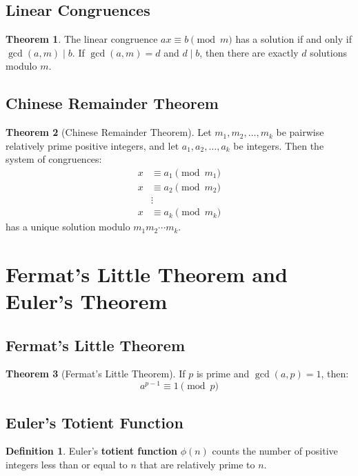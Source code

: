 \documentclass[11pt]{article}
\theoremstyle{definition}
\newtheorem{definition}{Definition}[section]
\newtheorem{theorem}{Theorem}[section]
\begin{document}
\subsection{Linear Congruences}
\begin{theorem}
The linear congruence $ax \equiv b \pmod{m}$ has a solution if and only if $\gcd(a,m) \mid b$. If $\gcd(a,m) = d$ and $d \mid b$, then there are exactly $d$ solutions modulo $m$.
\end{theorem}

\subsection{Chinese Remainder Theorem}
\begin{theorem}[Chinese Remainder Theorem]
Let $m_1, m_2, \ldots, m_k$ be pairwise relatively prime positive integers, and let $a_1, a_2, \ldots, a_k$ be integers. Then the system of congruences:
\begin{align}
x &\equiv a_1 \pmod{m_1} \\
x &\equiv a_2 \pmod{m_2} \\
&\vdots \\
x &\equiv a_k \pmod{m_k}
\end{align}
has a unique solution modulo $m_1 m_2 \cdots m_k$.
\end{theorem}

\section{Fermat's Little Theorem and Euler's Theorem}

\subsection{Fermat's Little Theorem}
\begin{theorem}[Fermat's Little Theorem]
If $p$ is prime and $\gcd(a,p) = 1$, then:
$$a^{p-1} \equiv 1 \pmod{p}$$
\end{theorem}

\subsection{Euler's Totient Function}
\begin{definition}
Euler's \textbf{totient function} $\phi(n)$ counts the number of positive integers less than or equal to $n$ that are relatively prime to $n$.
\end{definition}
\end{document}
